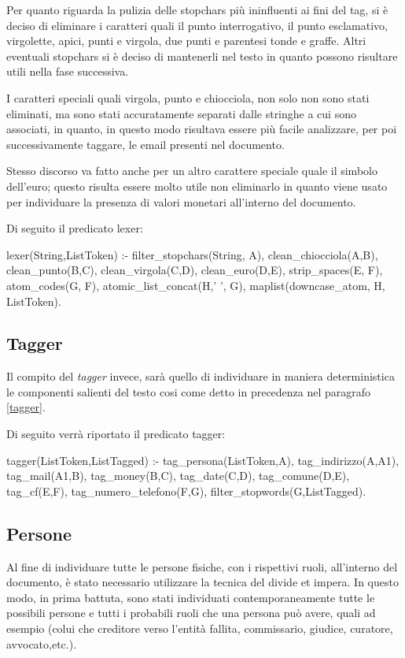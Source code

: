 Per quanto riguarda la pulizia delle stopchars più ininfluenti ai fini del tag, si è deciso di eliminare i caratteri quali il punto interrogativo, il punto esclamativo, virgolette, apici, punti e virgola, due punti e parentesi tonde e graffe. Altri eventuali stopchars si è deciso di mantenerli nel testo in quanto possono risultare utili nella fase successiva.

I caratteri speciali quali virgola, punto e chiocciola, non solo non sono stati eliminati, ma sono stati accuratamente separati dalle stringhe a cui sono associati, in quanto, in questo modo risultava essere più facile analizzare, per poi successivamente taggare, le email presenti nel documento.

Stesso discorso va fatto anche per un altro carattere speciale quale il simbolo dell'euro; questo risulta essere molto utile non eliminarlo in quanto viene usato per individuare la presenza di valori monetari all'interno del documento.

Di seguito il predicato lexer:

\begin{prologcode}
lexer(String,ListToken) :-
    filter_stopchars(String, A),
    clean_chiocciola(A,B),
    clean_punto(B,C),
    clean_virgola(C,D),
    clean_euro(D,E),
    strip_spaces(E, F),
    atom_codes(G, F),
    atomic_list_concat(H,' ', G),
    maplist(downcase_atom, H, ListToken).
\end{prologcode}

\subsection{Tagger}
Il compito del \emph{tagger} invece, sarà quello di individuare in maniera deterministica le componenti salienti del testo cosi come detto in precedenza nel paragrafo \ref{tagger}.

Di seguito verrà riportato il predicato tagger:

\begin{prologcode}
tagger(ListToken,ListTagged) :-
    tag_persona(ListToken,A),
    tag_indirizzo(A,A1),
    tag_mail(A1,B),
    tag_money(B,C),
    tag_date(C,D),
    tag_comune(D,E),
    tag_cf(E,F),
    tag_numero_telefono(F,G),
    filter_stopwords(G,ListTagged).
\end{prologcode}

\subsection{Persone}
Al fine di individuare tutte le persone fisiche, con i rispettivi ruoli, all'interno del documento, è stato necessario utilizzare la tecnica del divide et impera. In questo modo, in prima battuta, sono stati individuati contemporaneamente tutte le possibili persone e tutti i probabili ruoli che una persona può avere, quali ad esempio (colui che creditore verso l'entità fallita, commissario, giudice, curatore, avvocato,etc.).

